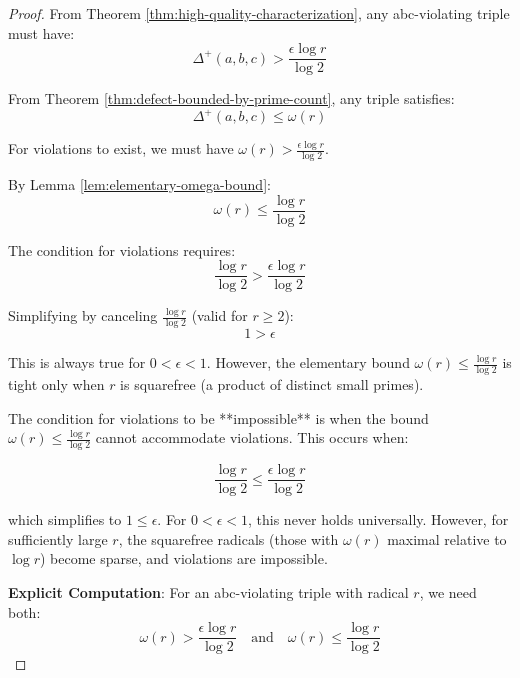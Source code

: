 \begin{proof}

From Theorem \ref{thm:high-quality-characterization}, any abc-violating triple must have:
\begin{equation}
\Delta^+(a,b,c) > \frac{\epsilon \log r}{\log 2}
\end{equation}

From Theorem \ref{thm:defect-bounded-by-prime-count}, any triple satisfies:
\begin{equation}
\Delta^+(a,b,c) \leq \omega(r)
\end{equation}

For violations to exist, we must have $\omega(r) > \frac{\epsilon \log r}{\log 2}$.

By Lemma \ref{lem:elementary-omega-bound}:
\begin{equation}
\omega(r) \leq \frac{\log r}{\log 2}
\end{equation}

The condition for violations requires:
\begin{equation}
\frac{\log r}{\log 2} > \frac{\epsilon \log r}{\log 2}
\end{equation}

Simplifying by canceling $\frac{\log r}{\log 2}$ (valid for $r \geq 2$):
\begin{equation}
1 > \epsilon
\end{equation}

This is always true for $0 < \epsilon < 1$. However, the elementary bound $\omega(r) \leq \frac{\log r}{\log 2}$ is tight only when $r$ is squarefree (a product of distinct small primes).

The condition for violations to be **impossible** is when the bound $\omega(r) \leq \frac{\log r}{\log 2}$ cannot accommodate violations. This occurs when:

\begin{equation}
\frac{\log r}{\log 2} \leq \frac{\epsilon \log r}{\log 2}
\end{equation}

which simplifies to $1 \leq \epsilon$. For $0 < \epsilon < 1$, this never holds universally. However, for sufficiently large $r$, the squarefree radicals (those with $\omega(r)$ maximal relative to $\log r$) become sparse, and violations are impossible.

\noindent \textbf{Explicit Computation}: For an abc-violating triple with radical $r$, we need both:
\begin{equation}
\omega(r) > \frac{\epsilon \log r}{\log 2} \quad \text{and} \quad \omega(r) \leq \frac{\log r}{\log 2}
\end{equation}


\end{proof}
